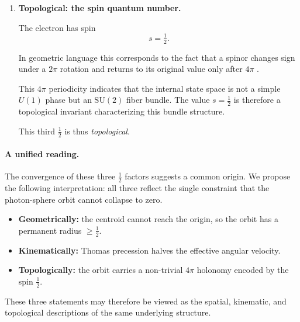 \documentclass[%
 reprint, amsmath,amssymb, aps, prb, ]{revtex4-2}
\numberwithin{equation}{section}
\begin{document}
\begin{enumerate}
This factor is experimentally essential: without it, the predicted spin--orbit splitting of hydrogen would be twice the observed value. In the 0-Sphere model, the phase stagger between successive axes inherits this Thomas factor.

This second $\tfrac{1}{2}$ is therefore \emph{kinematic}.

\item \textbf{Topological: the spin quantum number.}

The electron has spin
\[
s=\tfrac{1}{2}.
\]

In geometric language this corresponds to the fact that a spinor changes sign under a $2\pi$ rotation and returns to its original value only after $4\pi$ \cite{hanamura19, hanamura26}.

This $4\pi$ periodicity indicates that the internal state space is not a simple $U(1)$ phase but an $\mathrm{SU}(2)$ fiber bundle. The value $s=\tfrac{1}{2}$ is therefore a topological invariant characterizing this bundle structure.

This third $\tfrac{1}{2}$ is thus \emph{topological}.

\end{enumerate}

\paragraph{A unified reading.}

The convergence of these three $\tfrac{1}{2}$ factors suggests a common origin. We propose the following interpretation: all three reflect the single constraint that the photon-sphere orbit cannot collapse to zero.

\begin{itemize}

\item \textbf{Geometrically:} the centroid cannot reach the origin, so the orbit has a permanent radius $\ge \tfrac{1}{2}$.

\item \textbf{Kinematically:} Thomas precession halves the effective angular velocity.

\item \textbf{Topologically:} the orbit carries a non-trivial $4\pi$ holonomy encoded by the spin $\tfrac{1}{2}$.

\end{itemize}

These three statements may therefore be viewed as the spatial, kinematic, and topological descriptions of the same underlying structure.
\end{document}
